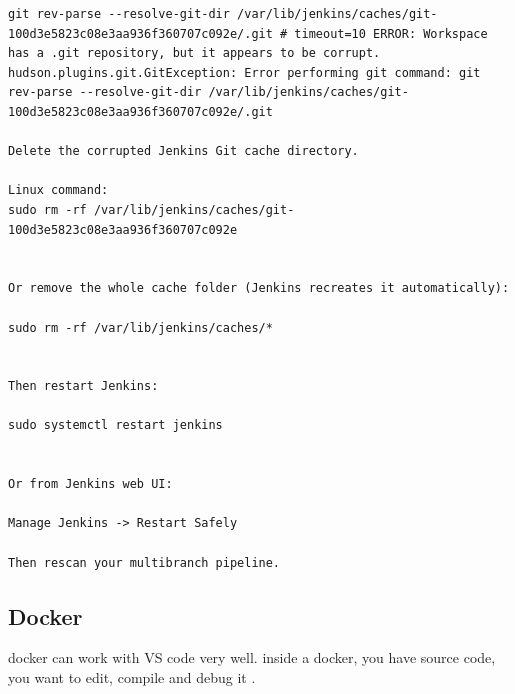 \documentclass[paper=8.5in:11in, twoside, 12pt, pagesize=pdftex]{book}
\begin{document}
\begin{lstlisting}
git rev-parse --resolve-git-dir /var/lib/jenkins/caches/git-100d3e5823c08e3aa936f360707c092e/.git # timeout=10 ERROR: Workspace has a .git repository, but it appears to be corrupt. hudson.plugins.git.GitException: Error performing git command: git rev-parse --resolve-git-dir /var/lib/jenkins/caches/git-100d3e5823c08e3aa936f360707c092e/.git

Delete the corrupted Jenkins Git cache directory.

Linux command:
sudo rm -rf /var/lib/jenkins/caches/git-100d3e5823c08e3aa936f360707c092e


Or remove the whole cache folder (Jenkins recreates it automatically):

sudo rm -rf /var/lib/jenkins/caches/*


Then restart Jenkins:

sudo systemctl restart jenkins


Or from Jenkins web UI:

Manage Jenkins -> Restart Safely

Then rescan your multibranch pipeline.
\end{lstlisting}


\subsection{Docker}
docker can work with VS code very well.  inside a docker, you have source code, you want to edit, compile and debug it . 
\end{document}
